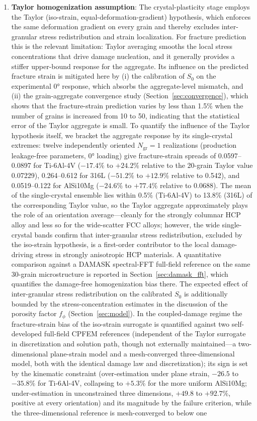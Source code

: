 \documentclass[12pt,a4paper,twocolumn]{article}
\begin{document}
\begin{enumerate}
    \item \textbf{Taylor homogenization assumption}: The crystal-plasticity stage employs the Taylor (iso-strain, equal-deformation-gradient) hypothesis, which enforces the same deformation gradient on every grain and thereby excludes inter-granular stress redistribution and strain localization. For fracture prediction this is the relevant limitation: Taylor averaging smooths the local stress concentrations that drive damage nucleation, and it generally provides a stiffer upper-bound response for the aggregate. Its influence on the predicted fracture strain is mitigated here by (i) the calibration of $S_0$ on the experimental $\ang{0}$ response, which absorbs the aggregate-level mismatch, and (ii) the grain-aggregate convergence study (Section~\ref{sec:convergence}), which shows that the fracture-strain prediction varies by less than 1.5\% when the number of grains is increased from 10 to 50, indicating that the statistical error of the Taylor aggregate is small. To quantify the influence of the Taylor hypothesis itself, we bracket the aggregate response by its single-crystal extremes: twelve independently oriented $N_{\mathrm{gr}}=1$ realizations (production leakage-free parameters, $\ang{0}$ loading) give fracture-strain spreads of 0.0597--0.0897 for Ti-6Al-4V ($-17.4\%$ to $+24.2\%$ relative to the 20-grain Taylor value 0.07229), 0.264--0.612 for 316L ($-51.2\%$ to $+12.9\%$ relative to 0.542), and 0.0519--0.122 for AlSi10Mg ($-24.6\%$ to $+77.4\%$ relative to 0.0688). The mean of the single-crystal ensemble lies within 0.5\% (Ti-6Al-4V) to 13.8\% (316L) of the corresponding Taylor value, so the Taylor aggregate approximately plays the role of an orientation average---cleanly for the strongly columnar HCP alloy and less so for the wide-scatter FCC alloys; however, the wide single-crystal bands confirm that inter-granular stress redistribution, excluded by the iso-strain hypothesis, is a first-order contributor to the local damage-driving stress in strongly anisotropic HCP materials. A quantitative comparison against a DAMASK spectral-FFT full-field reference on the same 30-grain microstructure is reported in Section~\ref{sec:damask_fft}, which quantifies the damage-free homogenization bias there. The expected effect of inter-granular stress redistribution on the calibrated $S_0$ is additionally bounded by the stress-concentration estimates in the discussion of the porosity factor $f_\phi$ (Section~\ref{sec:model}). In the coupled-damage regime the fracture-strain bias of the iso-strain surrogate is quantified against two self-developed full-field CPFEM references (independent of the Taylor surrogate in discretization and solution path, though not externally maintained---a two-dimensional plane-strain model and a mesh-converged three-dimensional model, both with the identical damage law and discretization); its sign is set by the kinematic constraint (over-estimation under plane strain, $-26.5$ to $-35.8\%$ for Ti-6Al-4V, collapsing to $+5.3\%$ for the more uniform AlSi10Mg; under-estimation in unconstrained three dimensions, $+49.8$ to $+92.7\%$, positive at every orientation) and its magnitude by the failure criterion, while the three-dimensional reference is mesh-converged to below one 
\end{enumerate}
\end{document}
